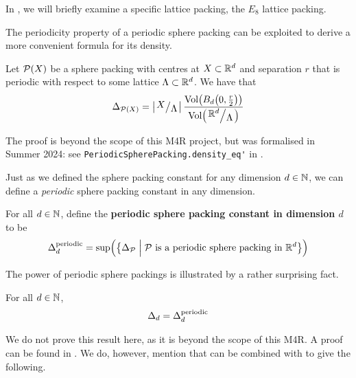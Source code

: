 In , we will briefly examine a specific lattice packing, the $E_8$ lattice packing.

The periodicity property of a periodic sphere packing can be exploited to derive a more convenient formula for its density.

\begin{boxproposition}\label{Ch2:Prop:Periodic_Density}
    Let $\mathcal{P}(X)$ be a sphere packing with centres at $X \subset \mathbb{R}^d$ and separation $r$ that is periodic with respect to some lattice $\Lambda \subset \mathbb{R}^d$. We have that
    \begin{align}
        \Delta_{\Pa(X)} = \abs{\quotient{X}{\Lambda}} \frac{\Volof{B_d\of{0, \frac{r}{2}}}}{\Volof{\quotient{\R^d}{\Lambda}}}
        \label{Ch2:Eq:Periodic_Density}
    \end{align}
\end{boxproposition}

The proof is beyond the scope of this M4R project, but was formalised in Summer 2024: see \verb|PeriodicSpherePacking.density_eq'| in \cite[\texttt{SpherePacking.Basic.PeriodicPacking}]{documentation}.

Just as we defined the sphere packing constant for any dimension $d \in \mathbb{N}$, we can define a \textit{periodic} sphere packing constant in any dimension.

\begin{boxdefinition}
    For all $d \in \mathbb{N}$, define the \textbf{periodic sphere packing constant in dimension $d$} to be
    \begin{align*}
        \Delta_{d}^{\operatorname{periodic}} = \sup\!\left( {\left\{ \Delta_{\mathcal{P}} \; \middle\vert \; \mathcal{P} \text{ is a periodic sphere packing in } \mathbb{R}^d \right\}} \right)
    \end{align*}
\end{boxdefinition}

The power of periodic sphere packings is illustrated by a rather surprising fact.

\begin{boxproposition}\label{Ch2:Prop:Periodic_Const_eq_Const}
    For all $d \in \mathbb{N}$,
    \begin{align*}
        \Delta_{d} = \Delta_{d}^{\operatorname{periodic}}
    \end{align*}
\end{boxproposition}

We do not prove this result here, as it is beyond the scope of this M4R. A proof can be found in \cite[Appendix A]{CohnElkies}. We do, however, mention that  can be combined with  to give the following.


